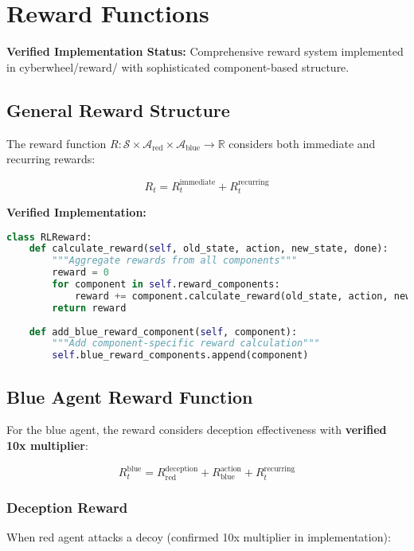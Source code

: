 \documentclass[12pt,a4paper]{article}
\begin{document}
\section{Reward Functions}

\textbf{Verified Implementation Status:} Comprehensive reward system implemented in cyberwheel/reward/ with sophisticated component-based structure.

\subsection{General Reward Structure}
The reward function $R: \mathcal{S} \times \mathcal{A}_{\text{red}} \times \mathcal{A}_{\text{blue}} \rightarrow \mathbb{R}$ considers both immediate and recurring rewards:

\begin{equation}
R_t = R_t^{\text{immediate}} + R_t^{\text{recurring}}
\end{equation}

\textbf{Verified Implementation:}
\begin{lstlisting}[language=Python, caption=Reward Component System (cyberwheel/reward/rl\_reward.py)]
class RLReward:
    def calculate_reward(self, old_state, action, new_state, done):
        """Aggregate rewards from all components"""
        reward = 0
        for component in self.reward_components:
            reward += component.calculate_reward(old_state, action, new_state, done)
        return reward
        
    def add_blue_reward_component(self, component):
        """Add component-specific reward calculation"""
        self.blue_reward_components.append(component)
\end{lstlisting}

\subsection{Blue Agent Reward Function}
For the blue agent, the reward considers deception effectiveness with \textbf{verified 10x multiplier}:

\begin{equation}
R_t^{\text{blue}} = R_{\text{red}}^{\text{deception}} + R_{\text{blue}}^{\text{action}} + R_t^{\text{recurring}}
\end{equation}

\subsubsection{Deception Reward}
When red agent attacks a decoy (confirmed 10x multiplier in implementation):
\end{document}
